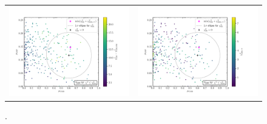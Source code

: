 \documentclass[12pt]{article}
\begin{document}
\begin{figure}[ht!]
	\begin{center}
		\begin{tabular}{cc}
			\centering
			\hspace*{-3mm}
			\includegraphics[scale=0.40]{figs/4_hs.pdf} &
			\includegraphics[scale=0.40]{figs/4_ll.pdf}
		\end{tabular}
		\caption{.}
		\label{fig:typeiimu}
	\end{center}
\end{figure}
\end{document}
